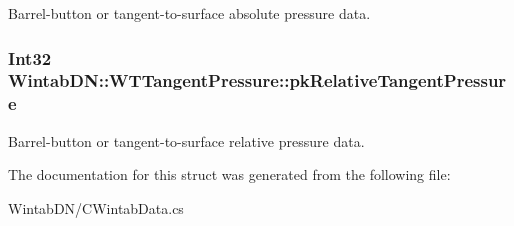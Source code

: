 Barrel-\/button or tangent-\/to-\/surface absolute pressure data. 

\hypertarget{struct_wintab_d_n_1_1_w_t_tangent_pressure_a288b2232530d1fba63a412d6aa724b86}{
\subsubsection[{pkRelativeTangentPressure}]{\setlength{\rightskip}{0pt plus 5cm}Int32 {\bf WintabDN::WTTangentPressure::pkRelativeTangentPressure}}}
\label{struct_wintab_d_n_1_1_w_t_tangent_pressure_a288b2232530d1fba63a412d6aa724b86}


Barrel-\/button or tangent-\/to-\/surface relative pressure data. 



The documentation for this struct was generated from the following file:\begin{DoxyCompactItemize}
\item 
WintabDN/CWintabData.cs\end{DoxyCompactItemize}
